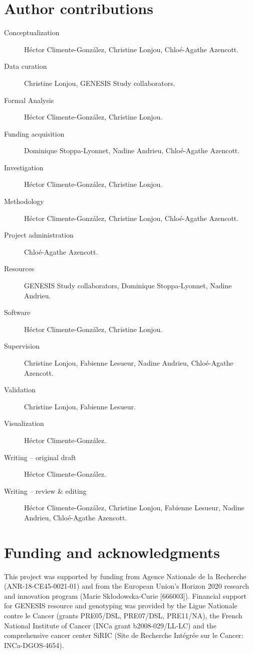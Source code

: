 \documentclass[twocolumn, 11pt]{article}
\begin{document}
\section*{Author contributions}

\begin{description}
  \item[Conceptualization] Héctor Climente-González, Christine Lonjou, Chloé-Agathe Azencott.
  \item[Data curation] Christine Lonjou, GENESIS Study collaborators.
  \item[Formal Analysis] Héctor Climente-González, Christine Lonjou.
  \item[Funding acquisition] Dominique Stoppa-Lyonnet, Nadine Andrieu, Chloé-Agathe Azencott.
  \item[Investigation] Héctor Climente-González, Christine Lonjou.
  \item[Methodology] Héctor Climente-González, Christine Lonjou, Chloé-Agathe Azencott.
  \item[Project administration] Chloé-Agathe Azencott.
  \item[Resources] GENESIS Study collaborators, Dominique Stoppa-Lyonnet, Nadine Andrieu.
  \item[Software] Héctor Climente-González, Christine Lonjou.
  \item[Supervision] Christine Lonjou, Fabienne Lesueur, Nadine Andrieu, Chloé-Agathe Azencott.
  \item[Validation] Christine Lonjou, Fabienne Lesueur.
  \item[Visualization] Héctor Climente-González.
  \item[Writing – original draft] Héctor Climente-González.
  \item[Writing – review \& editing] Héctor Climente-González, Christine Lonjou, Fabienne Lesueur, Nadine Andrieu, Chloé-Agathe Azencott.
\end{description}

\section*{Funding and acknowledgments}

This project was supported by funding from Agence Nationale de la Recherche (ANR-18-CE45-0021-01) and from the European Union’s Horizon 2020 research and innovation program (Marie Skłodowska-Curie [666003]). Financial support for GENESIS resource and genotyping was provided by the Ligue Nationale contre le Cancer (grants PRE05/DSL, PRE07/DSL, PRE11/NA), the French National Institute of Cancer (INCa grant b2008-029/LL-LC) and the comprehensive cancer center SiRIC (Site de Recherche Intégrée sur le Cancer: INCa-DGOS-4654).
\end{document}
